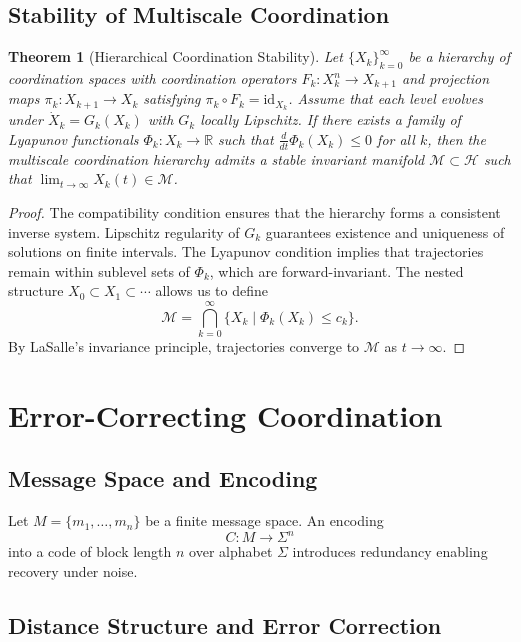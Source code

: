 \documentclass[12pt]{article}
\newtheorem{theorem}{Theorem}[section]
\begin{document}
\subsection{Stability of Multiscale Coordination}

\begin{theorem}[Hierarchical Coordination Stability]
Let $\{X_k\}_{k=0}^{\infty}$ be a hierarchy of coordination spaces with coordination operators
$F_k : X_k^n \rightarrow X_{k+1}$
and projection maps
$\pi_k : X_{k+1} \rightarrow X_k$
satisfying $\pi_k \circ F_k = \mathrm{id}_{X_k}$.
Assume that each level evolves under $\dot{X}_k = G_k(X_k)$ with $G_k$ locally Lipschitz.
If there exists a family of Lyapunov functionals $\Phi_k : X_k \to \mathbb{R}$ such that
$\tfrac{d}{dt}\Phi_k(X_k) \le 0$ for all $k$, then the multiscale coordination hierarchy admits a stable invariant manifold
$\mathcal{M} \subset \mathcal{H}$ such that $\lim_{t \to \infty} X_k(t) \in \mathcal{M}$.
\end{theorem}

\begin{proof}
The compatibility condition ensures that the hierarchy forms a consistent inverse system. Lipschitz regularity of $G_k$ guarantees existence and uniqueness of solutions on finite intervals. The Lyapunov condition implies that trajectories remain within sublevel sets of $\Phi_k$, which are forward-invariant. The nested structure $X_0 \subset X_1 \subset \cdots$ allows us to define
\[
\mathcal{M} = \bigcap_{k=0}^{\infty} \{ X_k \mid \Phi_k(X_k) \le c_k \}.
\]
By LaSalle's invariance principle, trajectories converge to $\mathcal{M}$ as $t \to \infty$.
\end{proof}

\section{Error-Correcting Coordination}

\subsection{Message Space and Encoding}

Let $M = \{m_1, \dots, m_n\}$ be a finite message space. An encoding
\[
C : M \rightarrow \Sigma^n
\]
into a code of block length $n$ over alphabet $\Sigma$ introduces redundancy enabling recovery under noise.

\subsection{Distance Structure and Error Correction}
\end{document}
